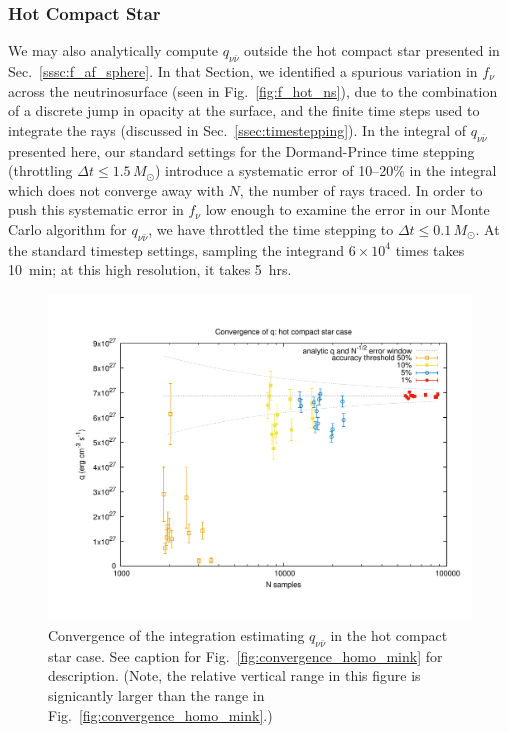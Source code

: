 \subsubsection{Hot Compact Star}
\label{sssc:q_af_sphere}
We may also analytically compute $q_{\nu\bar{\nu}}$ outside the hot compact
star presented in Sec.~\ref{sssc:f_af_sphere}.
In that Section, we identified a spurious
variation in $f_\nu$ across the neutrinosurface (seen in
Fig.~\ref{fig:f_hot_ns}), due to the combination of a discrete jump in opacity
at the surface, and the finite time steps used to integrate the rays
(discussed in Sec.~\ref{ssec:timestepping}).
In the integral of $q_{\nu\bar{\nu}}$ presented here, our standard settings
for the Dormand-Prince time stepping (throttling $\Delta t\leq1.5\,M_\odot$)
introduce a systematic error of 10--20\% in the integral which does not converge
away with $N$, the number of rays traced.
In order to push this systematic error in $f_\nu$ low enough to examine the
error in our Monte Carlo algorithm for $q_{\nu\bar{\nu}}$,
we have throttled the time stepping to $\Delta t \leq0.1\,M_\odot$.
At the standard timestep settings, sampling the integrand $6\times10^4$ times
takes 10~min; at this high resolution, it takes 5~hrs.

\begin{figure}
  \centering
  \includegraphics[width=16cm]{Figures/convergence_asano_fukuyama}
  \caption[Convergence of $q_{\nu\bar{\nu}}$ in the hot compact star case]{
    Convergence of the integration estimating $q_{\nu\bar{\nu}}$ in the
    hot compact star case.
    See caption for Fig.~\ref{fig:convergence_homo_mink} for description.
    (Note, the relative vertical range in this figure is signicantly larger
    than the range in Fig.~\ref{fig:convergence_homo_mink}.)
  }
  \label{fig:convergence_af_sphere}
\end{figure}

